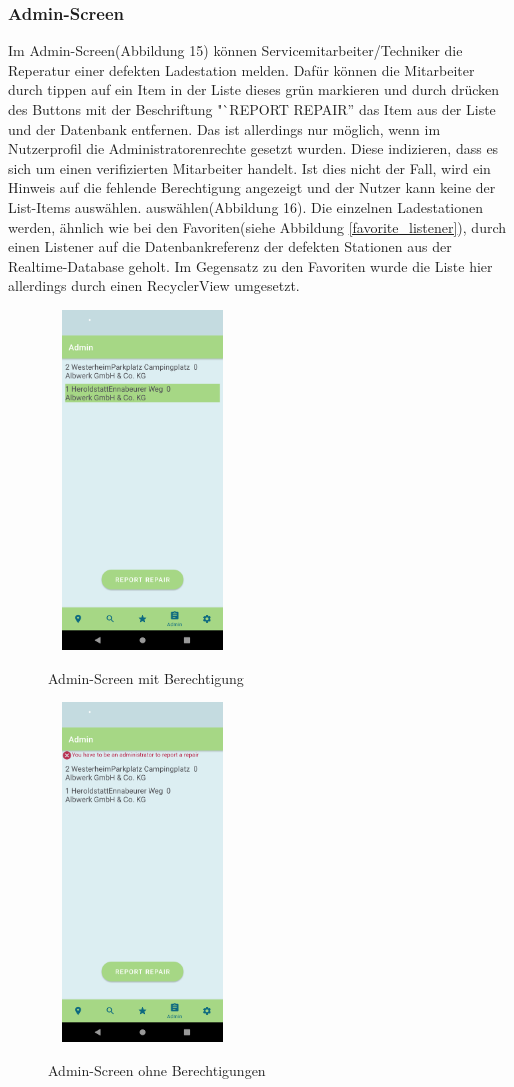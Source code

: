 \documentclass[12pt, a4paper, oneside]{article}
\begin{document}
\subsubsection{Admin-Screen}
Im Admin-Screen(Abbildung 15) können Servicemitarbeiter/Techniker die Reperatur einer defekten Ladestation melden. Dafür können die Mitarbeiter durch tippen auf ein Item in der Liste dieses grün markieren und durch drücken des Buttons mit der Beschriftung  "`REPORT REPAIR'' das Item aus der Liste und der Datenbank entfernen. Das ist allerdings nur möglich, wenn im Nutzerprofil die Administratorenrechte gesetzt wurden. Diese indizieren, dass es sich um einen verifizierten Mitarbeiter handelt. Ist dies nicht der Fall, wird ein Hinweis auf die fehlende Berechtigung angezeigt und der Nutzer kann keine der List-Items auswählen. auswählen(Abbildung 16). Die einzelnen Ladestationen werden, ähnlich wie bei den Favoriten(siehe Abbildung \ref{favorite_listener}), durch einen Listener auf die Datenbankreferenz der defekten Stationen aus der Realtime-Database geholt. Im Gegensatz zu den Favoriten wurde die Liste hier allerdings durch einen RecyclerView umgesetzt. 
\begin{figure}
\includegraphics[width=5cm, height=9cm]{Admin-Screen.png}
\centering
\label{admin}
\caption{Admin-Screen mit Berechtigung}
\end{figure}
\begin{figure}
\includegraphics[width=5cm, height=9cm]{Admin-denied.png}
\centering
\label{admin_denied}
\caption{Admin-Screen ohne Berechtigungen}
\end{figure}
\end{document}
